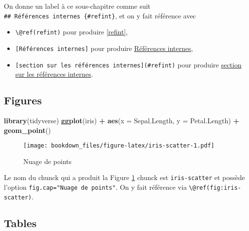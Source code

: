 \documentclass[]{book}
\newenvironment{Shaded}{\begin{snugshade}}{\end{snugshade}}
\newcommand{\CommentTok}[1]{\textcolor[rgb]{0.56,0.35,0.01}{\textit{#1}}}
\newcommand{\DataTypeTok}[1]{\textcolor[rgb]{0.13,0.29,0.53}{#1}}
\newcommand{\KeywordTok}[1]{\textcolor[rgb]{0.13,0.29,0.53}{\textbf{#1}}}
\newcommand{\NormalTok}[1]{#1}
\newcommand{\OperatorTok}[1]{\textcolor[rgb]{0.81,0.36,0.00}{\textbf{#1}}}
\newcommand{\StringTok}[1]{\textcolor[rgb]{0.31,0.60,0.02}{#1}}
\theoremstyle{definition}
\theoremstyle{definition}
\theoremstyle{definition}
\theoremstyle{remark}
\begin{document}
On donne un label à ce sous-chapitre comme suit \texttt{\#\#\ Références\ internes\ \{\#refint\}}, et on y fait référence avec

\begin{itemize}
\item
  \texttt{\textbackslash{}@ref(refint)} pour produire \ref{refint},
\item
  \texttt{{[}Références\ internes{]}} pour produire \protect\hyperlink{refint}{Références internes},
\item
  \texttt{{[}section\ sur\ les\ références\ internes{]}(\#refint)} pour produire \protect\hyperlink{refint}{section sur les références internes}.
\end{itemize}

\hypertarget{figures}{%
\subsection{Figures}\label{figures}}

\begin{Shaded}
\begin{Highlighting}[]
\KeywordTok{library}\NormalTok{(tidyverse)}
\KeywordTok{ggplot}\NormalTok{(iris) }\OperatorTok{+}
\StringTok{  }\KeywordTok{aes}\NormalTok{(}\DataTypeTok{x =}\NormalTok{ Sepal.Length, }\DataTypeTok{y =}\NormalTok{ Petal.Length) }\OperatorTok{+}
\StringTok{  }\KeywordTok{geom_point}\NormalTok{()}
\end{Highlighting}
\end{Shaded}

\begin{figure}
\centering
\texttt{[image: bookdown\_files/figure-latex/iris-scatter-1.pdf]}
\caption{\label{fig:iris-scatter}Nuage de points}
\end{figure}

Le nom du chunck qui a produit la Figure \ref{fig:iris-scatter} chunck est \texttt{iris-scatter} et possède l'option \texttt{fig.cap="Nuage\ de\ points"}. On y fait référence via \texttt{\textbackslash{}@ref(fig:iris-scatter)}.

\hypertarget{tables}{%
\subsection{Tables}\label{tables}}

\begin{Shaded}
\end{Shaded}
\end{document}
